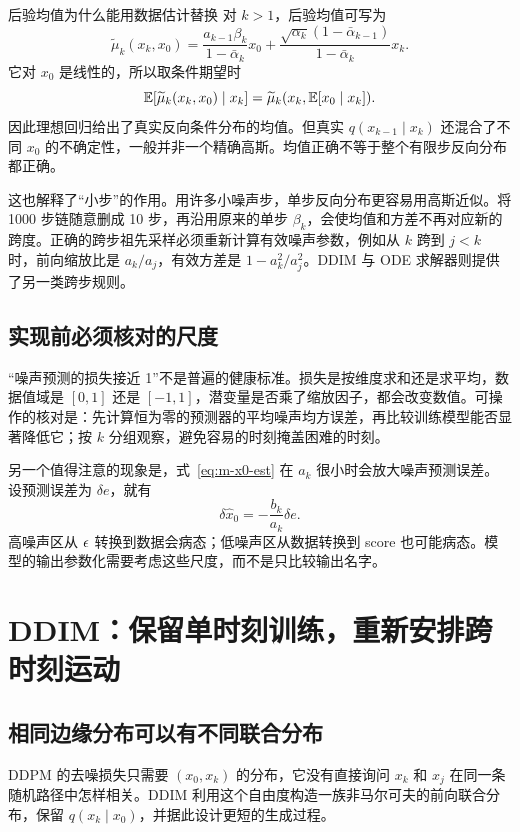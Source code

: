 \begin{derivationbox}{后验均值为什么能用数据估计替换}
对 $k>1$，后验均值可写为
\[
 \widetilde\mu_k(x_k,x_0)
 =\frac{a_{k-1}\beta_k}{1-\bar\alpha_k}x_0
 +\frac{\sqrt{\alpha_k}(1-\bar\alpha_{k-1})}{1-\bar\alpha_k}x_k.
\]
它对 $x_0$ 是线性的，所以取条件期望时
\[
 \mathbb{E}[\widetilde\mu_k(x_k,x_0)\mid x_k]
 =\widetilde\mu_k(x_k,\mathbb{E}[x_0\mid x_k]).
\]
因此理想回归给出了真实反向条件分布的均值。但真实
$q(x_{k-1}\mid x_k)$ 还混合了不同 $x_0$ 的不确定性，一般并非一个精确高斯。均值正确不等于整个有限步反向分布都正确。
\end{derivationbox}

这也解释了“小步”的作用。用许多小噪声步，单步反向分布更容易用高斯近似。将 1000 步链随意删成 10 步，再沿用原来的单步 $\beta_k$，会使均值和方差不再对应新的跨度。正确的跨步祖先采样必须重新计算有效噪声参数，例如从 $k$ 跨到 $j<k$ 时，前向缩放比是 $a_k/a_j$，有效方差是 $1-a_k^2/a_j^2$。DDIM 与 ODE 求解器则提供了另一类跨步规则。

\subsection{实现前必须核对的尺度}

“噪声预测的损失接近 1”不是普遍的健康标准。损失是按维度求和还是求平均，数据值域是 $[0,1]$ 还是 $[-1,1]$，潜变量是否乘了缩放因子，都会改变数值。可操作的核对是：先计算恒为零的预测器的平均噪声均方误差，再比较训练模型能否显著降低它；按 $k$ 分组观察，避免容易的时刻掩盖困难的时刻。

另一个值得注意的现象是，式~\eqref{eq:m-x0-est} 在 $a_k$ 很小时会放大噪声预测误差。设预测误差为 $\delta e$，就有
\[
 \delta\widehat x_0=-\frac{b_k}{a_k}\delta e.
\]
高噪声区从 $\epsilon$ 转换到数据会病态；低噪声区从数据转换到 score 也可能病态。模型的输出参数化需要考虑这些尺度，而不是只比较输出名字。

\section{DDIM：保留单时刻训练，重新安排跨时刻运动}
\label{sec:m-ddim}

\subsection{相同边缘分布可以有不同联合分布}

DDPM 的去噪损失只需要 $(x_0,x_k)$ 的分布，它没有直接询问 $x_k$ 和 $x_j$ 在同一条随机路径中怎样相关。DDIM 利用这个自由度构造一族非马尔可夫的前向联合分布，保留 $q(x_k\mid x_0)$，并据此设计更短的生成过程。\cite{m_ddim}

